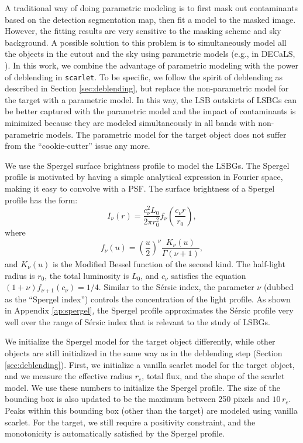 \documentclass[twocolumn,astrosymb,twocolappendix]{aastex631}
\newcommand{\code}[1]{\texttt{#1}}
\newcommand{\sersic}{S\'ersic}
\begin{document}
\begin{CJK*}{UTF8}{gbsn}
A traditional way of doing parametric modeling is to first mask out contaminants based on the detection segmentation map, then fit a model to the masked image. However, the fitting results are very sensitive to the masking scheme \citep[e.g.,][]{Greco2018} and sky background. A possible solution to this problem is to simultaneously model all the objects in the cutout and the sky using parametric models (e.g., in DECaLS, \citealt{Dey2019}). In this work, we combine the advantage of parametric modeling with the power of deblending in \code{scarlet}. To be specific, we follow the spirit of deblending as described in Section \ref{sec:deblending}, but replace the non-parametric model for the target with a parametric model. In this way, the LSB outskirts of LSBGs can be better captured with the parametric model and the impact of contaminants is minimized because they are modeled simultaneously in all bands with non-parametric models. The parametric model for the target object does not suffer from the ``cookie-cutter'' issue any more. 

We use the Spergel surface brightness profile \citep{Spergel2010} to model the LSBGs. The Spergel profile is motivated by having a simple analytical expression in Fourier space, making it easy to convolve with a PSF. The surface brightness of a Spergel profile has the form:
\begin{equation}
    \label{eq:spergel}
    I_\nu(r) = \frac{c_{\nu}^{2} L_{0}}{2\pi r_{0}^{2}} f_{\nu}\left(\frac{c_{\nu} r}{r_{0}}\right),
\end{equation}
where 
\begin{equation}
    f_{\nu}(u)=\left(\frac{u}{2}\right)^{\nu} \frac{K_{\nu}(u)}{\Gamma(\nu+1)},
\end{equation}
and $K_\nu(u)$ is the Modified Bessel function of the second kind. The half-light radius is $r_0$, the total luminosity is $L_0$, and $c_\nu$ satisfies the equation $(1 + \nu)f_{\nu + 1}(c_\nu) = 1/4$. Similar to the \sersic{} index, the parameter $\nu$ (dubbed as the ``Spergel index'') controls the concentration of the light profile. As shown in Appendix \ref{ap:spergel}, the Spergel profile approximates the \sersic{} profile very well over the range of \sersic{} index that is relevant to the study of LSBGs.

We initialize the Spergel model for the target object differently, while other objects are still initialized in the same way as in the deblending step (Section \ref{sec:deblending}). First, we initialize a vanilla scarlet model for the target object, and we measure the effective radius $r_e$, total flux, and the shape of the scarlet model. We use these numbers to initialize the Spergel profile. The size of the bounding box is also updated to be the maximum between 250 pixels and $10\, r_e$. Peaks within this bounding box (other than the target) are modeled using vanilla scarlet. For the target, we still require a positivity constraint, and the monotonicity is automatically satisfied by the Spergel profile. 


\end{CJK*}
\end{document}
